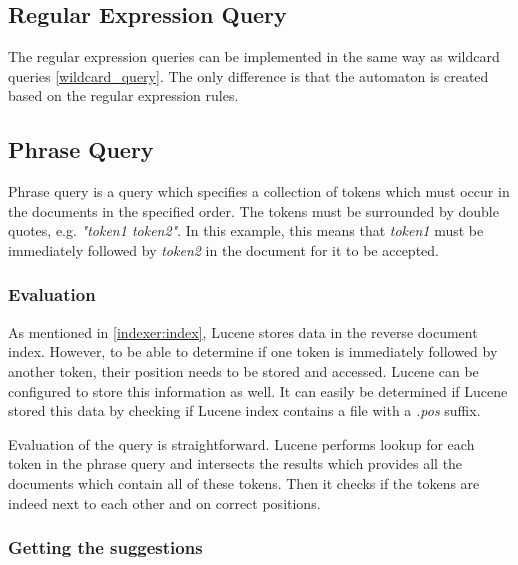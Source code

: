 \subsection{Regular Expression Query}
The regular expression queries can be implemented in the same way as wildcard queries \ref{wildcard_query}. The only difference
is that the automaton is created based on the regular expression rules.

\subsection{Phrase Query}
\label{suggest_phrase_query}
Phrase query is a query which specifies a collection of tokens which must occur in the documents in the specified order.
The tokens must be surrounded by double quotes, e.g. \textit{"token1 token2"}. In this example, this means that \textit{token1} must be immediately followed by
\textit{token2} in the document for it to be accepted.

\subsubsection{Evaluation}
\label{prefix_evaluation}
As mentioned in \ref{indexer:index},
Lucene stores data in the reverse document index. However, to be able to determine if one token is immediately followed by another
token, their position needs to be stored and accessed. Lucene can be configured to store this information as well.
It can easily be determined if Lucene stored this data by checking if Lucene index contains a file with a \textit{.pos}
suffix.

Evaluation of the query is straightforward. Lucene performs lookup for each token in the phrase query and intersects the
results which provides all the documents which contain all of these tokens. Then it checks if the tokens are indeed
next to each other and on correct positions.

\subsubsection{Getting the suggestions}
